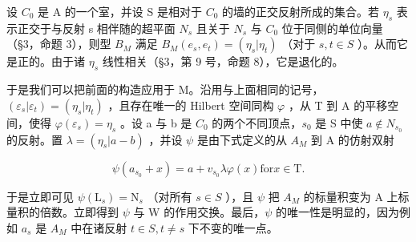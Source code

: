 设 \(C_0\) 是 A 的一个室，并设 S 是相对于 \(C_0\) 的墙的正交反射所成的集合。若 \(\eta_s\) 表示正交于与反射 s 相伴随的超平面 \(N_s\) 且关于 \(N_s\) 与 \(C_0\) 位于同侧的单位向量（§3，命题 3），则型 \(B_M\) 满足 \(B_M(e_s, e_t) = (\eta_s | \eta_t)\) （对于 \(s, t \in S\) ）。从而它是正的。由于诸 \(\eta_s\) 线性相关（§3，第 9 号，命题 8），它是退化的。

于是我们可以把前面的构造应用于 M。沿用与上面相同的记号，\((\varepsilon_{s}|\varepsilon_{t}) = (\eta_{s}|\eta_{t})\) ，且存在唯一的 Hilbert 空间同构 \(\varphi\) ，从 T 到 A 的平移空间，使得 \(\varphi(\varepsilon_{s}) = \eta_{s}\) 。设 a 与 b 是 \(C_{0}\) 的两个不同顶点，\(s_{0}\) 是 S 中使 \(a \notin N_{s_{0}}\) 的反射。置 \(\lambda = (\eta_{s}|a - b)\) ，并设 \(\psi\) 是由下式定义的从 \(A_{M}\) 到 A 的仿射双射

\[
\psi \left(a _ {s _ {0}} + x\right) = a + v _ {s _ {0}} \lambda \varphi (x) \text {for} x \in \mathrm{T}.
\]

于是立即可见 \(\psi(\mathrm{L}_{s}) = \mathrm{N}_{s}\) （对所有 \(s \in S\) ），且 \(\psi\) 把 \(A_{M}\) 的标量积变为 A 上标量积的倍数。立即得到 \(\psi\) 与 W 的作用交换。最后，\(\psi\) 的唯一性是明显的，因为例如 \(a_{s}\) 是 \(A_{M}\) 中在诸反射 \(t \in S, t \neq s\) 下不变的唯一点。

